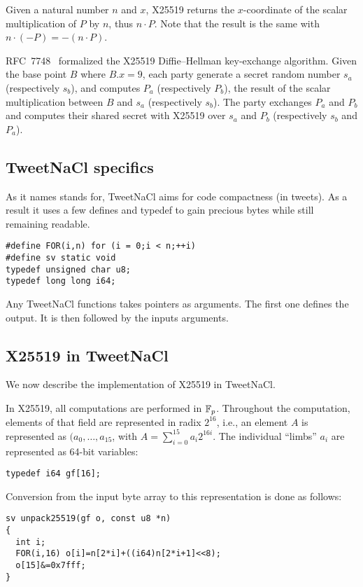 Given a natural number $n$ and $x$, X25519 returns the $x$-coordinate of the
scalar multiplication of $P$ by $n$, thus $n \cdot P$. Note that the result is the
same with $n \cdot (-P) = -(n \cdot P)$.

RFC~7748~\cite{rfc7748} formalized the X25519 Diffie–Hellman key-exchange algorithm.
Given the base point $B$ where $B.x=9$, each party generate a secret random number
$s_a$ (respectively $s_b$), and computes $P_a$ (respectively $P_b$), the result
of the scalar multiplication between $B$ and $s_a$ (respectively $s_b$).
The party exchanges $P_a$ and $P_b$ and computes their shared secret with X25519
over $s_a$ and $P_b$ (respectively $s_b$ and $P_a$).

\subsection{TweetNaCl specifics}
\label{preliminaries:B}
As it names stands for, TweetNaCl aims for code compactness (in tweets).
As a result it uses a few defines and typedef to gain precious bytes while
still remaining readable.
\begin{lstlisting}[language=Ctweetnacl]
#define FOR(i,n) for (i = 0;i < n;++i)
#define sv static void
typedef unsigned char u8;
typedef long long i64;
\end{lstlisting}
Any TweetNaCl functions takes pointers as arguments.
The first one defines the output. It is then followed by the inputs arguments.

\subsection{X25519 in TweetNaCl}
\label{preliminaries:B}

We now describe the implementation of X25519 in TweetNaCl.

In X25519, all computations are performed in $\mathbb{F}_{p}$.
Throughout the computation, elements of that field
are represented in radix $2^{16}$,
i.e., an element $A$ is represented as $(a_0,\dots,a_{15}$,
with $A = \sum_{i=0}^{15}a_i2^{16i}$.
The individual ``limbs'' $a_i$ are represented as
64-bit  variables:

\begin{lstlisting}[language=Ctweetnacl]
typedef i64 gf[16];
\end{lstlisting}

Conversion from the input byte array to this representation is done
as follows:
\begin{lstlisting}[language=Ctweetnacl]
sv unpack25519(gf o, const u8 *n)
{
  int i;
  FOR(i,16) o[i]=n[2*i]+((i64)n[2*i+1]<<8);
  o[15]&=0x7fff;
}
\end{lstlisting}

